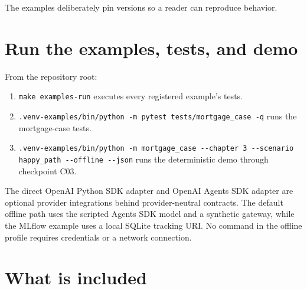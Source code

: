 The examples deliberately pin versions so a reader can reproduce behavior.\par

\section{Run the examples, tests, and demo}

From the repository root:\par

\begin{enumerate}

\item \lstinline[style=bookinline]!make examples-run! executes every registered example's tests.

\item \lstinline[style=bookinline]!.venv-examples/bin/python -m pytest tests/mortgage_case -q! runs the mortgage-case tests.

\item \lstinline[style=bookinline]!.venv-examples/bin/python -m mortgage_case --chapter 3 --scenario happy_path --offline --json! runs the deterministic demo through checkpoint C03.

\end{enumerate}

The direct OpenAI Python SDK adapter and OpenAI Agents SDK adapter are optional provider integrations behind provider-neutral contracts. The default offline path uses the scripted Agents SDK model and a synthetic gateway, while the MLflow example uses a local SQLite tracking URI. No command in the offline profile requires credentials or a network connection.\par

\section{What is included}

